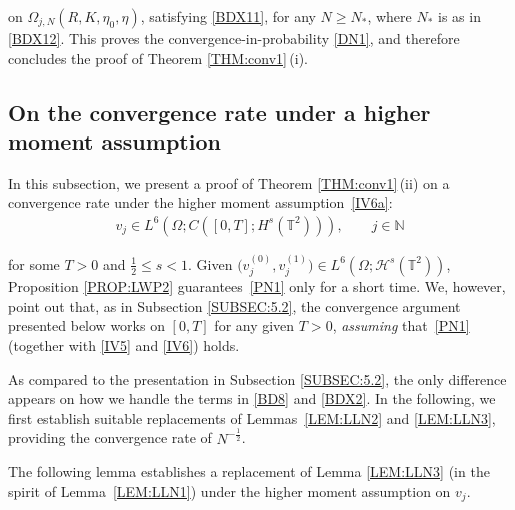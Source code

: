 \documentclass[letterpaper, 11pt,  reqno]{amsart}
\newcommand{\1}{\hspace{0.5mm}\text{I}\hspace{0.2mm}}
\newcommand{\noi}{\noindent}
\newcommand{\T}{\mathbb{T}}
\newcommand{\N}{\mathbb{N}}
\renewcommand{\H}{\mathcal{H}}
\renewcommand{\O}{\Omega}
\numberwithin{equation}{section}
\numberwithin{theorem}{section}
\begin{document}
\noi
on $\O_{j, N}  (R, K, \eta_0, \eta)$, 
satisfying 
\eqref{BDX11}, 
for any 
 $N \ge N_*$, 
 where 
$N_*$ is as in  
\eqref{BDX12}.
 This proves
the 
convergence-in-probability 
\eqref{DN1}, 
and therefore
 concludes the proof of  Theorem \ref{THM:conv1}\,(i).




\subsection{On the convergence rate
under a higher moment assumption}
\label{SUBSEC:5.3}



In this subsection, 
we present a proof of Theorem \ref{THM:conv1}\,(ii)
on a convergence rate under the higher moment assumption~\eqref{IV6a}:
\begin{align}
v_j \in L^6 (\Omega; C([0, T]; H^{s} (\T^2))), \qquad j \in \N
\label{PN1}
\end{align}


\noi
for some $T > 0$ and $\frac 12 \le s < 1$.
Given  $\big(v_j^{(0)}, v_j^{(1)}\big) \in L^6 (\Omega; \H^s (\T^2) )$, 
Proposition \ref{PROP:LWP2}
guarantees~\eqref{PN1}
only for a short time.
We, however,  point out
that, 
as in Subsection \ref{SUBSEC:5.2}, 
the convergence argument presented below
works on $[0, T]$ for any given $T > 0$, 
{\it assuming}  that~\eqref{PN1} 
(together with \eqref{IV5} and \eqref{IV6}) holds.





As compared to the presentation
in Subsection \ref{SUBSEC:5.2}, 
the only difference appears on 
how we handle the terms in \eqref{BD8}
and \eqref{BDX2}.
In the following, we first 
 establish 
suitable replacements
of 
Lemmas~\ref{LEM:LLN2} and \ref{LEM:LLN3}, 
providing the convergence rate of $N^{-\frac 12}$.


The following lemma establishes a replacement of 
 Lemma \ref{LEM:LLN3} 
 (in the spirit of Lemma~\ref{LEM:LLN1}) under the higher moment assumption on $v_j$.
\end{document}
